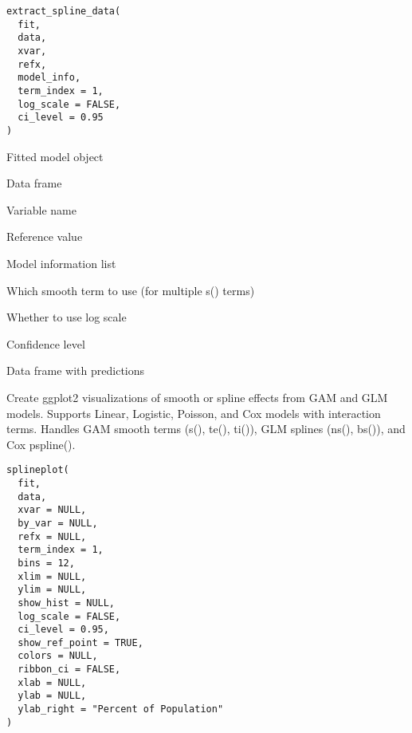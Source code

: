 \documentclass[letterpaper]{book}
\begin{document}
%
\begin{Usage}
\begin{verbatim}
extract_spline_data(
  fit,
  data,
  xvar,
  refx,
  model_info,
  term_index = 1,
  log_scale = FALSE,
  ci_level = 0.95
)
\end{verbatim}
\end{Usage}
%
\begin{Arguments}
\begin{ldescription}
\item[\code{fit}] Fitted model object

\item[\code{data}] Data frame

\item[\code{xvar}] Variable name

\item[\code{refx}] Reference value

\item[\code{model\_info}] Model information list

\item[\code{term\_index}] Which smooth term to use (for multiple s() terms)

\item[\code{log\_scale}] Whether to use log scale

\item[\code{ci\_level}] Confidence level
\end{ldescription}
\end{Arguments}
%
\begin{Value}
Data frame with predictions
\end{Value}
%
\begin{Description}
Create ggplot2 visualizations of smooth or spline effects from GAM and GLM models.
Supports Linear, Logistic, Poisson, and Cox models with interaction terms.
Handles GAM smooth terms (s(), te(), ti()), GLM splines (ns(), bs()), and Cox pspline().
\end{Description}
%
\begin{Usage}
\begin{verbatim}
splineplot(
  fit,
  data,
  xvar = NULL,
  by_var = NULL,
  refx = NULL,
  term_index = 1,
  bins = 12,
  xlim = NULL,
  ylim = NULL,
  show_hist = NULL,
  log_scale = FALSE,
  ci_level = 0.95,
  show_ref_point = TRUE,
  colors = NULL,
  ribbon_ci = FALSE,
  xlab = NULL,
  ylab = NULL,
  ylab_right = "Percent of Population"
)
\end{verbatim}
\end{Usage}
\end{document}
